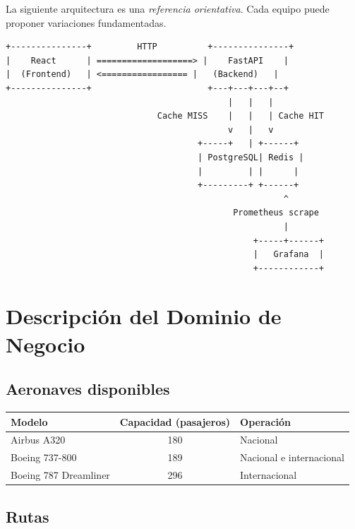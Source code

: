 \documentclass[12pt,a4paper]{article}
\begin{document}
La siguiente arquitectura es una \textit{referencia orientativa}. Cada equipo puede proponer variaciones fundamentadas.

\begin{verbatim}
+---------------+         HTTP          +---------------+
|    React      | ===================> |    FastAPI    |
|  (Frontend)   | <================= |   (Backend)   |
+---------------+                       +---+---+---+--+
                                            |   |   |
                              Cache MISS    |   |   | Cache HIT
                                            v   |   v
                                      +-----+   | +------+
                                      | PostgreSQL| Redis |
                                      |         | |      |
                                      +---------+ +------+
                                                       ^
                                             Prometheus scrape
                                                       |
                                                 +-----+------+
                                                 |   Grafana  |
                                                 +------------+
\end{verbatim}

\section{Descripción del Dominio de Negocio}

\subsection{Aeronaves disponibles}

\begin{center}
\begin{tabular}{|l|c|l|}
\hline
\textbf{Modelo} & \textbf{Capacidad (pasajeros)} & \textbf{Operación} \\
\hline
Airbus A320       & 180 & Nacional \\
Boeing 737-800    & 189 & Nacional e internacional \\
Boeing 787 Dreamliner & 296 & Internacional \\
\hline
\end{tabular}
\end{center}

\subsection{Rutas}
\end{document}
